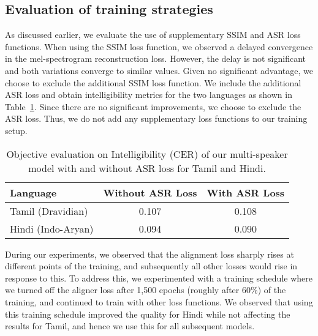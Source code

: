 \documentclass{article}
\begin{document}
\subsection{Evaluation of training strategies}
\label{subsec:loss}
As discussed earlier, we evaluate the use of supplementary SSIM and ASR loss functions.
When using the SSIM loss function, we observed a delayed convergence in the mel-spectrogram reconstruction loss.
However, the delay is not significant and both variations converge to similar values. 
Given no significant advantage, we choose to exclude the additional SSIM loss function.
We include the additional ASR loss and obtain intelligibility metrics for the two languages as shown in Table~\ref{tab:asr}. 
Since there are no significant improvements, we choose to exclude the ASR loss.
Thus, we do not add any supplementary loss functions to our training setup.

\begin{table}[!htbp]
\centering
\begingroup
\setlength{\tabcolsep}{6pt} \renewcommand{\arraystretch}{0.9} \begin{tabular}{@{}lcc@{}}
\toprule
\textbf{Language}  & {\textbf{Without ASR Loss}} & {\textbf{With ASR Loss}} \\ 
\midrule
Tamil (Dravidian)  & 0.107              & 0.108 \\ 
Hindi (Indo-Aryan) & 0.094             & 0.090  \\
\bottomrule
\end{tabular}
\endgroup
\caption{Objective evaluation on Intelligibility (CER) of our multi-speaker model with and without ASR loss for Tamil and Hindi.}
\label{tab:asr}
\end{table}

During our experiments, we observed that the alignment loss sharply rises at different points of the training, and subsequently all other losses would rise in response to this.
To address this, we experimented with a training schedule where we turned off the aligner loss after 1,500 epochs (roughly after 60\%) of the training, and continued to train with other loss functions.
We observed that using this training schedule improved the quality for Hindi while not affecting the results for Tamil, and hence we use this for all subsequent models.
\end{document}
